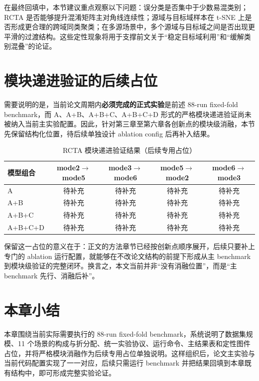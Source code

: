 在最终回填中，本节建议重点观察以下问题：误分类是否集中于少数易混类别；RCTA 是否能够提升混淆矩阵主对角线连续性；源域与目标域样本在 t-SNE 上是否形成更合理的跨域同类聚类；在多源场景中，多个源域与目标域之间是否出现更平滑的过渡结构。这些定性现象将用于支撑前文关于“稳定目标域利用”和“缓解类别混叠”的论证。

\section{模块递进验证的后续占位}
需要说明的是，当前论文周期内\textbf{必须完成的正式实验}是前述 88-run fixed-fold benchmark，而 A、A+B、A+B+C、A+B+C+D 形式的严格模块递进验证尚未被纳入当前主实验配置。因此，针对第三章至第六章各创新点的模块级消融，本节先保留结构化位置，待后续单独设计 ablation config 后再补入结果。

\begin{table}[htbp]
\centering
\caption{RCTA 模块递进验证结果（后续专用占位）}
\label{tab:rcta-ablation-plan}
\small
\begin{tabular}{lcccc}
\hline
模型组合 & mode2$\rightarrow$mode5 & mode3$\rightarrow$mode6 & mode5$\rightarrow$mode2 & mode6$\rightarrow$mode3 \\
\hline
A & 待补充 & 待补充 & 待补充 & 待补充 \\
A+B & 待补充 & 待补充 & 待补充 & 待补充 \\
A+B+C & 待补充 & 待补充 & 待补充 & 待补充 \\
A+B+C+D & 待补充 & 待补充 & 待补充 & 待补充 \\
\hline
\end{tabular}
\normalsize
\end{table}

保留这一占位的意义在于：正文的方法章节已经按创新点顺序展开，后续只要补上专门的 ablation 运行配置，就能够在不改论文结构的前提下形成从主 benchmark 到模块级验证的完整闭环。换言之，本文当前并非“没有消融位置”，而是“主 benchmark 先行、消融后补”。

\section{本章小结}
本章围绕当前实际需要执行的 88-run fixed-fold benchmark，系统说明了数据集规模、11 个场景的构成与折分配、统一实验协议、运行命令、主结果表和定性图件占位，并将严格模块消融作为后续专用占位单独说明。这样组织后，论文主实验与当前代码配置实现了一一对应，后续只需运行 benchmark 并把结果回填到本章既有结构中，即可形成完整实验论证。
